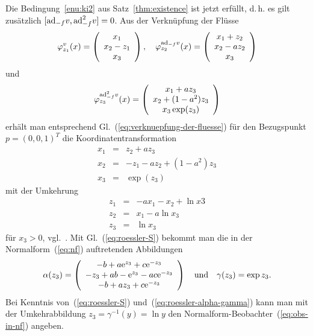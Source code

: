 \begin{example}
Die Bedingung~\ref{enu:ki2} aus Satz~\ref{thm:existence} ist jetzt
erfüllt, d.\,h. es gilt zusätzlich $[{\operatorname{ad}}_{-f}v,{\operatorname{ad}}_{-f}^{2}v]=0$.
Aus der Verknüpfung der Flüsse
\[
\varphi_{z_{1}}^{v}(x)=\left(\begin{array}{c}
x_{1}\\
x_{2}-z_{1}\\
x_{3}
\end{array}\right),\quad\varphi_{z_{2}}^{{\operatorname{ad}}_{-f}v}(x)=\left(\begin{array}{c}
x_{1}+z_{2}\\
x_{2}-az_{2}\\
x_{3}
\end{array}\right)
\]
und
\[
\varphi_{z_{3}}^{{\operatorname{ad}}_{-f}^{2}v}(x)=\left(\begin{array}{c}
x_{1}+az_{3}\\
x_{2}+(1-a^{2})z_{3}\\
x_{3}\exp(z_{3})
\end{array}\right)
\]
erhält man entsprechend Gl.~(\ref{eq:verknuepfung-der-fluesse})
für den Bezugspunkt $p=(0,0,1)^{T}$ die Koordinaten\-transformation
\begin{equation}
\begin{array}{lcl}
x_{1} & = & z_{2}+az_{3}\\
x_{2} & = & -z_{1}-az_{2}+(1-a^{2})z_{3}\\
x_{3} & = & \exp(z_{3})
\end{array}\label{eq:roessler-S}
\end{equation}
mit der Umkehrung 
\begin{equation}
\begin{array}{lcl}
z_{1} & = & -ax_{1}-x_{2}+\ln x3\\
z_{2} & = & x_{1}-a\ln x_{3}\\
z_{3} & = & \ln x_{3}
\end{array}\label{eq:roessler-T}
\end{equation}
für $x_{3}>0$, vgl.~\cite{nijmeijer97}. Mit Gl.~(\ref{eq:roessler-S})
bekommt man die in der Normalform~(\ref{eq:nf}) auftretenden Abbildungen
\begin{equation}
\alpha(z_{3})=\left(\begin{array}{c}
-b+a{\mathrm{e}}^{z_{3}}+c{\mathrm{e}}^{-z_{3}}\\
-z_{3}+ab-{\mathrm{e}}^{z_{3}}-ac{\mathrm{e}}^{-z_{3}}\\
-b+az_{3}+c{\mathrm{e}}^{-z_{3}}
\end{array}\right)\quad\mbox{und}\quad\gamma(z_{3})=\exp z_{3}.\label{eq:roessler-alpha-gamma}
\end{equation}
Bei Kenntnis von~(\ref{eq:roessler-S}) und~(\ref{eq:roessler-alpha-gamma})
kann man mit der Umkehrabbildung $z_{3}=\gamma^{-1}(y)=\ln y$ den
Normalform-Beobachter~(\ref{eq:obs-in-nf}) angeben. 
\end{example}

